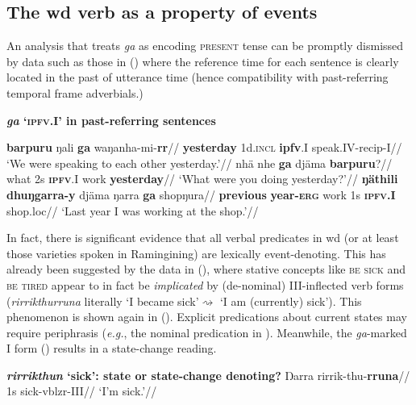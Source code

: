 \subsection{The \acrshort{wd} verb as a property of events}\label{sec:djr-stems}

An analysis that treats \textit{ga} as encoding \textsc{present} tense can be promptly dismissed by data such as those in (\nextx) where the reference time for each sentence is clearly located in the past of utterance time (hence compatibility with past-referring temporal frame adverbials.)

\pex \textbf{\textit{ga} `\textsc{ipfv}.\gls{I}' in past-referring sentences}\par\nobreak
\a\begingl\gla \textbf{barpuru} ŋali \textbf{ga} waŋanha-mi-\textbf{rr}//
\glb \textbf{yesterday} 1d.\textsc{incl} \textbf{\gls{ipfv}}.\gls{I} speak.\gls{IV}-\gls{recip}-\gls{I}//
\glft`We were speaking to each other yesterday.'\trailingcitation{[AW~20190426]}//\endgl
\a\begingl\gla nhä nhe \textbf{ga} djäma \textbf{barpuru}?//
\glb what 2s \textsc{\textbf{ipfv}}.\gls{I} work \textbf{yesterday}//
\glft`What were you doing yesterday?'\trailingcitation{[DhG 20190413]}//\endgl
\a\begingl\gla \textbf{ŋäthili} \textbf{dhuŋgarra-y} djäma ŋarra \textbf{ga} shopŋura//
\glb \textbf{previous} \textbf{year-\textsc{erg}} work 1s \textsc{\textbf{ipfv.\gls{I}}} shop.\gls{loc}//
\glft`Last year I was working at the shop.'\trailingcitation{[DB~20190416]}//\endgl
\xe

In fact, there is significant evidence that all verbal predicates in \gls{wd} (or at least those varieties spoken in Ramingining) are lexically event-denoting. This has already been suggested by the data in (), where stative concepts like \textsc{be sick} and \textsc{be tired} appear to in fact be \textit{implicated} by (de-nominal) \gls{III}-inflected verb forms (\textit{rirrikthurruna} literally `I became sick'$ \rightsquigarrow $ `I am (currently) sick'). This phenomenon is shown again in (). Explicit predications about current states may require periphrasis (\textit{e.g.}, the nominal predication in ). Meanwhile, the \textit{ga}-marked \gls{I} form () results in a state-change reading.

\pex\textbf{\textit{rirrikthun} `sick': state or state-change denoting?}
\a{}\begingl\gla Ŋarra rirrik-thu-\textbf{rruna}//
\glb 1s sick-\gls{vblzr}-\gls{III}//
\glft`I'm sick.'\trailingcitation[DB~20190405]//\endgl

